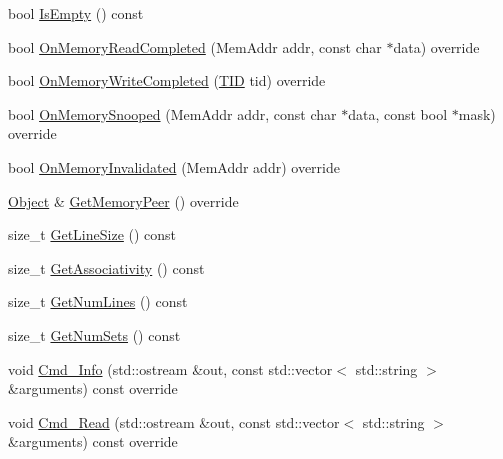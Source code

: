 \begin{DoxyCompactItemize}
\item 
bool \hyperlink{class_simulator_1_1drisc_1_1_i_cache_a235db7340ebe82220a35410cd61ce08c}{Is\+Empty} () const 
\item 
bool \hyperlink{class_simulator_1_1drisc_1_1_i_cache_aef4cb1f1456f90f644dd4697eeca2bb4}{On\+Memory\+Read\+Completed} (Mem\+Addr addr, const char $\ast$data) override
\item 
bool \hyperlink{class_simulator_1_1drisc_1_1_i_cache_ad07b2819c8bdf6a286eb484647d75d98}{On\+Memory\+Write\+Completed} (\hyperlink{namespace_simulator_a483cc4ecee1736e895054617672cded5}{T\+I\+D} tid) override
\item 
bool \hyperlink{class_simulator_1_1drisc_1_1_i_cache_a8d4a3d21efa066f6d624ec2bc3a8b370}{On\+Memory\+Snooped} (Mem\+Addr addr, const char $\ast$data, const bool $\ast$mask) override
\item 
bool \hyperlink{class_simulator_1_1drisc_1_1_i_cache_a53d755323405ba6efab15371ba95a435}{On\+Memory\+Invalidated} (Mem\+Addr addr) override
\item 
\hyperlink{class_simulator_1_1_object}{Object} \& \hyperlink{class_simulator_1_1drisc_1_1_i_cache_a389ebf0f8eec8d1f07752e97fda96176}{Get\+Memory\+Peer} () override
\item 
size\+\_\+t \hyperlink{class_simulator_1_1drisc_1_1_i_cache_a30b7686fc0988c3e40706ba58f2e17d2}{Get\+Line\+Size} () const 
\item 
size\+\_\+t \hyperlink{class_simulator_1_1drisc_1_1_i_cache_a720cfa1806d5676ab282e9fe2eb78f36}{Get\+Associativity} () const 
\item 
size\+\_\+t \hyperlink{class_simulator_1_1drisc_1_1_i_cache_a46cb90cbdd79699ba749b91be730a5d8}{Get\+Num\+Lines} () const 
\item 
size\+\_\+t \hyperlink{class_simulator_1_1drisc_1_1_i_cache_aaeb3d54075721320f8a553116c0b379f}{Get\+Num\+Sets} () const 
\item 
void \hyperlink{class_simulator_1_1drisc_1_1_i_cache_a64a13ee6d0ebcb28774f8443f140377c}{Cmd\+\_\+\+Info} (std\+::ostream \&out, const std\+::vector$<$ std\+::string $>$ \&arguments) const override
\item 
void \hyperlink{class_simulator_1_1drisc_1_1_i_cache_a3da79bb809b6d825c00aac432ae0b8b0}{Cmd\+\_\+\+Read} (std\+::ostream \&out, const std\+::vector$<$ std\+::string $>$ \&arguments) const override
\end{DoxyCompactItemize}
